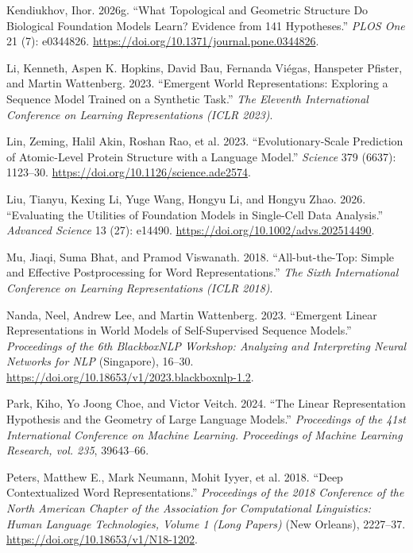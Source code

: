 \documentclass[
  11pt,
]{article}
\newlength{\cslhangindent}
\newenvironment{CSLReferences}[2] %
 {\begin{list}{}{%
  \setlength{\itemindent}{0pt}
  \setlength{\leftmargin}{0pt}
  \setlength{\parsep}{0pt}
  \ifodd #1
   \setlength{\leftmargin}{\cslhangindent}
   \setlength{\itemindent}{-1\cslhangindent}
  \fi
  \setlength{\itemsep}{#2\baselineskip}}}
 {\end{list}}
\begin{document}
\begin{CSLReferences}{1}{1}
Kendiukhov, Ihor. 2026g. {``What Topological and Geometric Structure Do
Biological Foundation Models Learn? {Evidence} from 141 Hypotheses.''}
\emph{PLOS One} 21 (7): e0344826.
\url{https://doi.org/10.1371/journal.pone.0344826}.

Li, Kenneth, Aspen K. Hopkins, David Bau, Fernanda Viégas, Hanspeter
Pfister, and Martin Wattenberg. 2023. {``Emergent World Representations:
Exploring a Sequence Model Trained on a Synthetic Task.''} \emph{{The
Eleventh International Conference on Learning Representations (ICLR
2023)}}.

{Lin, Zeming, Halil Akin, Roshan Rao, et al.} 2023.
{``Evolutionary-Scale Prediction of Atomic-Level Protein Structure with
a Language Model.''} \emph{Science} 379 (6637): 1123--30.
\url{https://doi.org/10.1126/science.ade2574}.

Liu, Tianyu, Kexing Li, Yuge Wang, Hongyu Li, and Hongyu Zhao. 2026.
{``Evaluating the Utilities of Foundation Models in Single-Cell Data
Analysis.''} \emph{Advanced Science} 13 (27): e14490.
\url{https://doi.org/10.1002/advs.202514490}.

Mu, Jiaqi, Suma Bhat, and Pramod Viswanath. 2018. {``All-but-the-Top:
Simple and Effective Postprocessing for Word Representations.''}
\emph{{The Sixth International Conference on Learning Representations
(ICLR 2018)}}.

Nanda, Neel, Andrew Lee, and Martin Wattenberg. 2023. {``Emergent Linear
Representations in World Models of Self-Supervised Sequence Models.''}
\emph{{Proceedings of the 6th BlackboxNLP Workshop: Analyzing and
Interpreting Neural Networks for NLP}} (Singapore), 16--30.
\url{https://doi.org/10.18653/v1/2023.blackboxnlp-1.2}.

Park, Kiho, Yo Joong Choe, and Victor Veitch. 2024. {``The Linear
Representation Hypothesis and the Geometry of Large Language Models.''}
\emph{{Proceedings of the 41st International Conference on Machine
Learning. Proceedings of Machine Learning Research, vol. 235}},
39643--66.

Peters, Matthew E., Mark Neumann, Mohit Iyyer, et al. 2018. {``Deep
Contextualized Word Representations.''} \emph{{Proceedings of the 2018
Conference of the North American Chapter of the Association for
Computational Linguistics: Human Language Technologies, Volume 1 (Long
Papers)}} (New Orleans), 2227--37.
\url{https://doi.org/10.18653/v1/N18-1202}.


\end{CSLReferences}
\end{document}
